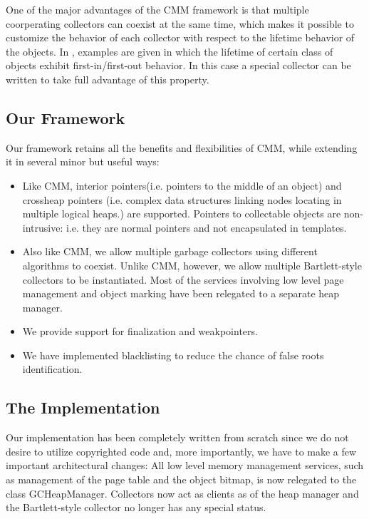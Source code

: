   One of the major advantages of the CMM framework is that multiple
coorperating collectors can coexist at the same time, which makes it
possible to customize the behavior of each collector with respect to
the lifetime behavior of the objects.  In \cite{CMM}, examples are
given in which the lifetime of certain class of objects exhibit
first-in/first-out behavior.  In this case a special collector can be
written to take full advantage of this property.

\subsection{Our Framework}
   Our framework retains all the benefits and flexibilities of CMM, 
while extending it in several minor but useful ways:  
\begin{itemize}
   \item Like CMM, interior pointers(i.e. pointers to the middle of an object)
and crossheap pointers (i.e. complex data structures linking nodes locating
in multiple logical heaps.) are supported.  Pointers to collectable
objects are non-intrusive: i.e. they are normal \CPP{} pointers 
and not encapsulated in templates.
   \item Also like CMM, we allow multiple garbage collectors using different
algorithms to coexist.  Unlike CMM, however, we allow multiple 
Bartlett-style collectors to be instantiated.  Most of the services 
involving low level page management and object marking have been relegated
to a separate heap manager.   
   \item We provide support for finalization and weakpointers.
   \item We have implemented blacklisting\cite{Boehm} to reduce the chance
of false roots identification.
\end{itemize}

\subsection{The Implementation}

   Our implementation has been completely written from scratch since
we do not desire to utilize copyrighted code and, more importantly,
we have to make a few important architectural changes:
 All low level memory management services, such as management of
the page table and the object bitmap, is now relegated to the class 
{\sf GCHeapManager}.  Collectors now act as clients as of the heap manager
and the Bartlett-style collector no longer has any special status. 

